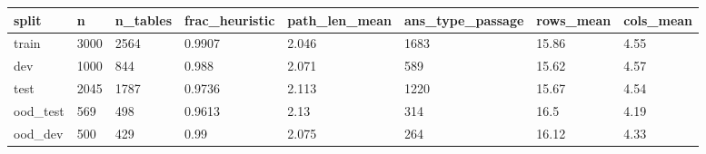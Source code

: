 \begin{tabular}{llllllll}
\toprule
split & n & n\_tables & frac\_heuristic & path\_len\_mean & ans\_type\_passage & rows\_mean & cols\_mean \\
\midrule
train & 3000 & 2564 & 0.9907 & 2.046 & 1683 & 15.86 & 4.55 \\
dev & 1000 & 844 & 0.988 & 2.071 & 589 & 15.62 & 4.57 \\
test & 2045 & 1787 & 0.9736 & 2.113 & 1220 & 15.67 & 4.54 \\
ood\_test & 569 & 498 & 0.9613 & 2.13 & 314 & 16.5 & 4.19 \\
ood\_dev & 500 & 429 & 0.99 & 2.075 & 264 & 16.12 & 4.33 \\
\bottomrule
\end{tabular}
